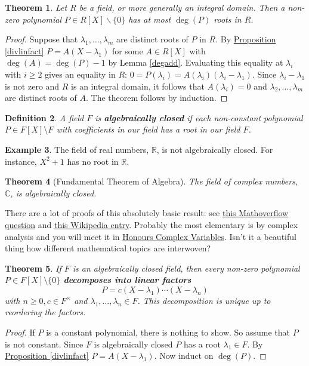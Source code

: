 \documentclass[11pt]{amsbook}
\newtheorem{theorem}{Theorem}[section]
\newtheorem{definition}[theorem]{Definition}
\theoremstyle{definition}
\newtheorem{ex}[theorem]{Example}
\begin{document}
\begin{theorem}
Let $R$ be a field, or more generally an integral domain. Then a non-zero polynomial $P\in R[X]\smallsetminus \{0\}$ has at most $\deg (P)$ roots in $R$.
\end{theorem}
\begin{proof}
Suppose that $\lambda_1, \ldots, \lambda_m$ are distinct roots of
$P$ in $R$. By \hyperref[divlinfact]{Proposition \ref{divlinfact}} $P = A(X-\lambda_1)$ for some $A \in R[X]$ with $\deg(A) = \deg (P) -1$ by Lemma \ref{degadd}. Evaluating this equality at $\lambda_i$ with $i\geqslant 2$ gives an equality in $R$: $0 = P(\lambda_i) = A(\lambda_i) (\lambda_i-\lambda_1)$. Since $\lambda_i-\lambda_1$ is not zero and $R$ is an integral domain, it follows that $A(\lambda_i) = 0$ and $\lambda_2, \ldots , \lambda_m$ are distinct roots of $A$. The theorem follows by induction.
\end{proof}

\begin{definition} \label{algclsdef}
A field $F$ is {\bf algebraically closed} if each non-constant polynomial $P\in F[X]\setminus F$ with coefficients in our field has a root in our field $F$.
\end{definition}

\begin{ex}
The field of real numbers, $\mathbb{R}$, is not algebraically closed. For instance, $X^2 +1$ has no root in $\mathbb{R}$.
\end{ex}

\begin{theorem}[Fundamental Theorem of Algebra]
The field of complex numbers, $\mathbb{C}$, is algebraically closed.
\end{theorem}
There are a lot of proofs of this absolutely basic result: see \href{http://mathoverflow.net/questions/10535/ways-to-prove-the-fundamental-theorem-of-algebra}{this Mathoverflow question} and \href{http://en.wikipedia.org/wiki/Fundamental_theorem_of_algebra}{this Wikipedia entry}. Probably the most elementary is by complex analysis and you will meet it in \href{http://www.drps.ed.ac.uk/14-15/dpt/cxmath10067.htm}{Honours Complex Variables}. Isn't it a beautiful thing how different mathematical topics are interwoven?

\begin{theorem} \label{decpoly}
If $F$ is an algebraically closed field, then every non-zero polynomial $P\in F[X]\setminus \{0\}$ {\bf decomposes into linear factors} $$P = c(X-\lambda_1) \cdots (X-\lambda_n)$$ with $n\geqslant 0, c\in F^{\times}$ and $\lambda_1, \ldots , \lambda_n \in F$. This decomposition is unique up to reordering the factors.
\end{theorem}
\begin{proof}If $P$ is a constant polynomial, there is nothing to show. So assume that $P$ is not constant. Since $F$ is algebraically closed $P$ has a root $\lambda_1\in F$. By \hyperref[divlinfact]{Proposition \ref{divlinfact}} $P = A(X-\lambda_1)$. Now induct on $\deg (P)$.
\end{proof}
\end{document}
